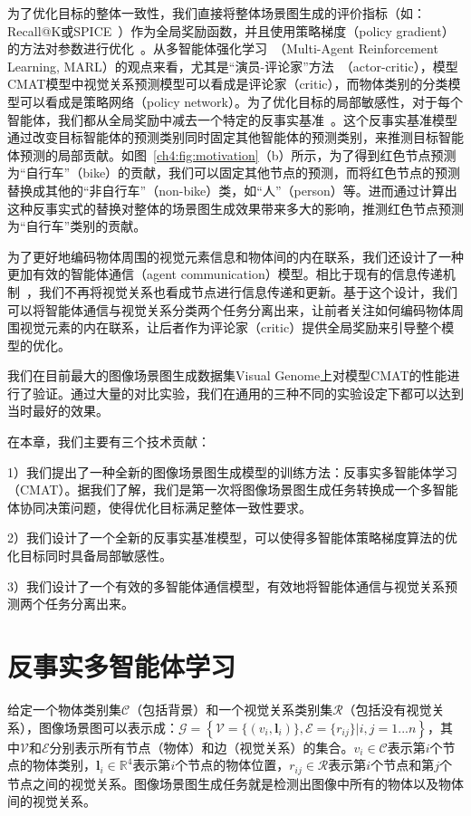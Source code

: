 为了优化目标的整体一致性，我们直接将整体场景图生成的评价指标（如：Recall@K或SPICE~\cite{anderson2016spice}）作为全局奖励函数，并且使用策略梯度（policy gradient）的方法对参数进行优化~\cite{sutton2000policy}。从多智能体强化学习~\cite{tampuu2017multiagent,lowe2017multi}（Multi-Agent Reinforcement Learning, MARL）的观点来看，尤其是“演员-评论家”方法~\cite{lowe2017multi}（actor-critic），模型CMAT模型中视觉关系预测模型可以看成是评论家（critic），而物体类别的分类模型可以看成是策略网络（policy network）。为了优化目标的局部敏感性，对于每个智能体，我们都从全局奖励中减去一个特定的反事实基准~\cite{foerster2018counterfactual}。这个反事实基准模型通过改变目标智能体的预测类别同时固定其他智能体的预测类别，来推测目标智能体预测的局部贡献。如图~\ref{ch4:fig:motivation}（b）所示，为了得到红色节点预测为“自行车”（bike）的贡献，我们可以固定其他节点的预测，而将红色节点的预测替换成其他的“非自行车”（non-bike）类，如“人”（person）等。进而通过计算出这种反事实式的替换对整体的场景图生成效果带来多大的影响，推测红色节点预测为“自行车”类别的贡献。

为了更好地编码物体周围的视觉元素信息和物体间的内在联系，我们还设计了一种更加有效的智能体通信（agent communication）模型。相比于现有的信息传递机制~\cite{xu2017scene, li2017scene, jae2018tensorize, li2017vip, yin2018zoom, li2018factorizable}，我们不再将视觉关系也看成节点进行信息传递和更新。基于这个设计，我们可以将智能体通信与视觉关系分类两个任务分离出来，让前者关注如何编码物体周围视觉元素的内在联系，让后者作为评论家（critic）提供全局奖励来引导整个模型的优化。

我们在目前最大的图像场景图生成数据集Visual Genome上对模型CMAT的性能进行了验证。通过大量的对比实验，我们在通用的三种不同的实验设定下都可以达到当时最好的效果。

在本章，我们主要有三个技术贡献：

1）我们提出了一种全新的图像场景图生成模型的训练方法：反事实多智能体学习（CMAT）。据我们了解，我们是第一次将图像场景图生成任务转换成一个多智能体协同决策问题，使得优化目标满足整体一致性要求。

2）我们设计了一个全新的反事实基准模型，可以使得多智能体策略梯度算法的优化目标同时具备局部敏感性。

3）我们设计了一个有效的多智能体通信模型，有效地将智能体通信与视觉关系预测两个任务分离出来。


\section{反事实多智能体学习}
给定一个物体类别集$\mathcal{C}$（包括背景）和一个视觉关系类别集$\mathcal{R}$（包括没有视觉关系），图像场景图可以表示成：$\mathcal{G} = \left\{ \mathcal{V}=\{(v_i, \bm{l}_i)\},\mathcal{E}=\{r_{ij}\} | i,j = 1...n \right\}$，其中$\mathcal{V}$和$\mathcal{E}$分别表示所有节点（物体）和边（视觉关系）的集合。$v_i \in \mathcal{C}$表示第$i$个节点的物体类别，$\bm{l}_i \in \mathbb{R}^4$表示第$i$个节点的物体位置，$r_{ij} \in \mathcal{R}$表示第$i$个节点和第$j$个节点之间的视觉关系。图像场景图生成任务就是检测出图像中所有的物体以及物体间的视觉关系。

